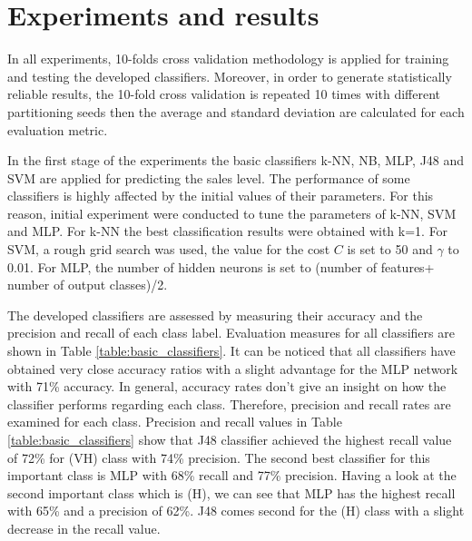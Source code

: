 \documentclass[a4paper,10pt,twocolumn,preprint,3p]{elsarticle}
\begin{document}
\section{Experiments and results}
\label{sec:experiments_results}


In all experiments, 10-folds cross validation methodology is applied for training and testing the developed classifiers. Moreover, in order to generate statistically reliable results, the 10-fold cross validation is repeated 10 times with different partitioning seeds then the average and standard deviation are calculated for each evaluation metric.

In the first stage of the experiments the basic classifiers k-NN, NB, MLP, J48 and SVM are applied for predicting the sales level. The performance of some classifiers is highly affected by the initial values of their parameters. For this reason, initial experiment were conducted to tune the parameters of k-NN, SVM and MLP. For k-NN the best classification results were obtained with k=1. For SVM, a rough grid search was used, the value for the cost $C$ is set to 50 and $\gamma$  to 0.01. For MLP, the number of hidden neurons is set to (number of features+ number of output classes)/2.


The developed classifiers are assessed by measuring their accuracy and the precision and recall of each class label. Evaluation measures for all classifiers are shown in Table \ref{table:basic_classifiers}. It can be noticed that all classifiers have obtained very close accuracy ratios with a slight advantage for the MLP network with 71\% accuracy. In general, accuracy rates don't give an insight on how the classifier performs regarding each class. Therefore, precision and recall rates are examined for each class. Precision and recall values in Table \ref{table:basic_classifiers} show that J48 classifier achieved the highest recall value of 72\% for (VH) class with 74\% precision. The second best classifier for this important class is MLP with 68\% recall and 77\% precision. Having a look at the second important class which is (H), we can see that MLP has the highest recall with 65\% and a precision of 62\%. J48 comes second for the (H) class with a slight decrease in the recall value.
\end{document}
